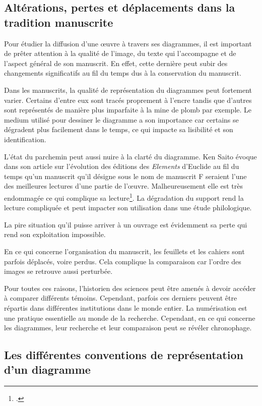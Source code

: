 \subsection{Altérations, pertes et déplacements dans la tradition manuscrite}


Pour étudier la diffusion d'une œuvre à travers ses diagrammes, il est important de prêter attention à la qualité de l'image, du texte qui l'accompagne et de l'aspect général de son manuscrit. En effet, cette dernière peut subir des changements significatifs au fil du temps dus à la conservation du manuscrit.

Dans les manuscrits, la qualité de représentation du diagrammes peut fortement varier. Certains d'entre eux sont tracés proprement à l'encre tandis que d'autres sont représentés de manière plus imparfaite à la mine de plomb par exemple. Le medium utilisé pour dessiner le diagramme a son importance car certains se dégradent plus facilement dans le temps, ce qui impacte sa lisibilité et son identification. 

L'état du parchemin peut aussi nuire à la clarté du diagramme. Ken Saito évoque dans son article sur l'évolution des éditions des \textit{Elements} d'Euclide au fil du temps qu'un manuscrit qu'il désigne sous le nom de \og manuscrit F \fg seraient l'une des meilleures lectures d'une partie de l'œuvre. Malheureusement elle est très endommagée ce qui complique sa lecture\footcite{saitoTraditionsDiagramTradition2012}. La dégradation du support rend la lecture compliquée et peut impacter son utilisation dans une étude philologique.

La pire situation qu'il puisse arriver à un ouvrage est évidemment sa perte qui rend son exploitation impossible.

En ce qui concerne l'organisation du manuscrit, les feuillets et les cahiers sont parfois déplacés, voire perdus. Cela complique la comparaison car l'ordre des images se retrouve aussi perturbée. 

Pour toutes ces raisons, l'historien des sciences peut être amenés à devoir accéder à comparer différents témoins. Cependant, parfois ces derniers peuvent être répartis dans différentes institutions dans le monde entier. La numérisation est une pratique essentielle au monde de la recherche. Cependant, en ce qui concerne les diagrammes, leur recherche et leur comparaison peut se révéler chronophage.




\subsection{Les différentes conventions de représentation d'un diagramme}

